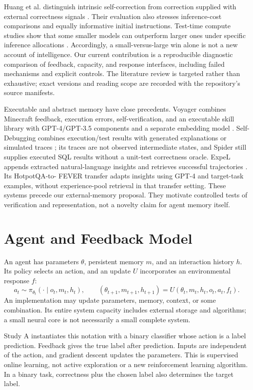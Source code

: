 \documentclass[11pt]{article}
\begin{document}
Huang et al. distinguish intrinsic self-correction from correction supplied
with external correctness signals \cite{huang}. Their evaluation also stresses
inference-cost comparisons and equally informative initial instructions.
Test-time compute studies show that some smaller models can outperform larger
ones under specific inference allocations \cite{snell}. Accordingly, a
small-versus-large win alone is not a new account of intelligence. Our current
contribution is a reproducible diagnostic comparison of feedback, capacity,
and response interfaces, including failed mechanisms and explicit controls.
The literature review is targeted rather than exhaustive; exact versions and
reading scope are recorded with the repository's source manifests.


Executable and abstract memory have close precedents. Voyager combines
Minecraft feedback, execution errors, self-verification, and an executable
skill library with GPT-4/GPT-3.5 components and a separate embedding model
\cite{voyager}. Self-Debugging combines execution/test results with generated
explanations or simulated traces \cite{selfdebug}; its traces are not observed
intermediate states, and Spider still supplies executed SQL results without
a unit-test correctness oracle. ExpeL appends extracted natural-language
insights and retrieves successful trajectories \cite{expel}. Its HotpotQA-to-
FEVER transfer adapts insights using GPT-4 and target-task examples, without
experience-pool retrieval in that transfer setting. These systems precede
our external-memory proposal. They motivate controlled tests of verification
and representation, not a novelty claim for agent memory itself.

\section{Agent and Feedback Model}
An agent has parameters $\theta$, persistent memory $m$, and an interaction
history $h$. Its policy selects an action, and an update $U$ incorporates an
environmental response $f$:
\[
 a_t\sim\pi_{\theta_t}(\cdot\mid o_t,m_t,h_t),\qquad
 (\theta_{t+1},m_{t+1},h_{t+1})=U(\theta_t,m_t,h_t,o_t,a_t,f_t).
\]
An implementation may update parameters, memory, context, or some combination.
Its entire system capacity includes external storage and algorithms; a small
neural core is not necessarily a small complete system.

Study A instantiates this notation with a binary classifier whose action is a
label prediction. Feedback gives the true label after prediction. Inputs are
independent of the action, and gradient descent updates the parameters. This
is supervised online learning, not active exploration or a new reinforcement
learning algorithm. In a binary task, correctness plus the chosen label also
determines the target label.
\end{document}
